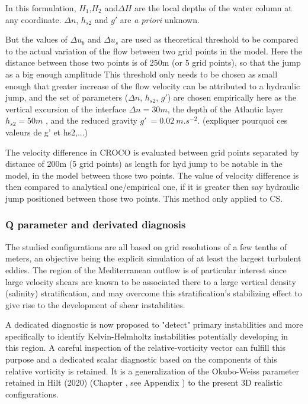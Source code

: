 In this formulation, $H_1$,$H_2$ and$\Delta H$ are the local depths of the water column at any coordinate. $\Delta n$, $h_{s2}$ and $g'$ are \textit{a priori} unknown.

But the values of $\Delta u_b$ and $\Delta u_s$ are used as theoretical threshold to be compared to the actual variation of the flow between two grid points in the model. \color{red}Here the distance between those two points is of 250m (or 5 grid points), so that the jump as a big enough amplitude\color{black} This threshold only needs to be chosen as small enough that greater increase of the flow velocity can be attributed to a hydraulic jump, and the set of parameters ($\Delta n$, $h_{s2}$, $g'$) are chosen empirically here as the vertical excursion of the interface $\Delta n = 30m$, the depth of the Atlantic layer $h_{s2}=50 m$ , and the reduced gravity $g'\ =0.02\ m.s^{-2}$. \color{red}(expliquer pourquoi ces valeurs de g' et hs2,...)\color{black}

\color{red}The velocity difference in CROCO is evaluated between grid points separated by distance of 200m (5 grid points) as length for hyd jump to be notable in the model, in the model between those two points. The value of velocity difference is then compared to analytical one/empirical one, if it is greater then say hydraulic jump positioned between those two points. This method only applied to CS.\color{black}

\subsubsection{Q parameter and derivated diagnosis}
\label{sectiondiagQ}

The studied configurations are all based on grid resolutions of a few tenths of meters, an objective being the explicit simulation of at least the largest turbulent eddies. The region of the Mediterranean outflow is of particular interest since large velocity shears are known to be associated there to a large vertical density (salinity) stratification, and may overcome this stratification's stabilizing effect to give rise to the development of shear instabilities. 

A dedicated diagnostic is now proposed to "detect" primary instabilities and more specifically to identify Kelvin-Helmholtz instabilities potentially developing in this region. 
A careful inspection of the relative-vorticity vector can fulfill this purpose and a dedicated scalar diagnostic based on the components of this relative vorticity is retained. It is a generalization of the Okubo-Weiss parameter retained in Hilt (2020) (Chapter , see Appendix ) to the present 3D realistic configurations. 


